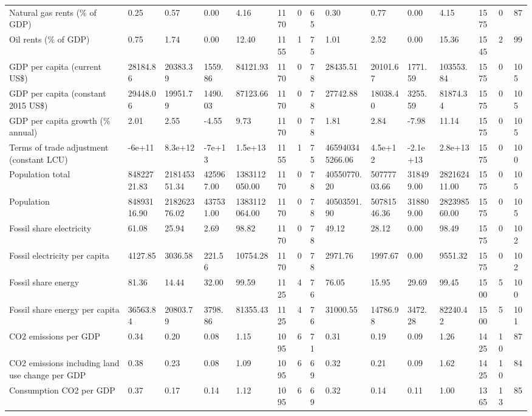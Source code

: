 \begin{longtable}{lllllllllllllll}
Natural gas rents (\% of GDP) & 0.25 & 0.57 & 0.00 & 4.16 & 1170 & 0 & 65 & 0.30 & 0.77 & 0.00 & 4.15 & 1575 & 0 & 87\\
Oil rents (\% of GDP) & 0.75 & 1.74 & 0.00 & 12.40 & 1155 & 1 & 75 & 1.01 & 2.52 & 0.00 & 15.36 & 1545 & 2 & 99\\
GDP per capita (current US\$) & 28184.86 & 20383.39 & 1559.86 & 84121.93 & 1170 & 0 & 78 & 28435.51 & 20101.67 & 1771.59 & 103553.84 & 1575 & 0 & 105\\
GDP per capita (constant 2015 US\$) & 29448.06 & 19951.79 & 1490.03 & 87123.66 & 1170 & 0 & 78 & 27742.88 & 18038.40 & 3255.59 & 81874.34 & 1575 & 0 & 105\\
\addlinespace
GDP per capita growth (\% annual) & 2.01 & 2.55 & -4.55 & 9.73 & 1170 & 0 & 78 & 1.81 & 2.84 & -7.98 & 11.14 & 1575 & 0 & 105\\
Terms of trade adjustment (constant LCU) & -6e+11 & 8.3e+12 & -7e+13 & 1.5e+13 & 1155 & 1 & 75 & 465940345266.06 & 4.5e+12 & -2.1e+13 & 2.8e+13 & 1575 & 0 & 100\\
Population total & 84822721.83 & 218145351.34 & 425967.00 & 1383112050.00 & 1170 & 0 & 78 & 40550770.20 & 50777703.66 & 318499.00 & 282162411.00 & 1575 & 0 & 105\\
Population & 84893116.90 & 218262376.02 & 437531.00 & 1383112064.00 & 1170 & 0 & 78 & 40503591.90 & 50781546.36 & 318809.00 & 282398560.00 & 1575 & 0 & 105\\
Fossil share electricity & 61.08 & 25.94 & 2.69 & 98.82 & 1170 & 0 & 78 & 49.12 & 28.12 & 0.00 & 98.49 & 1575 & 0 & 102\\
\addlinespace
Fossil electricity per capita & 4127.85 & 3036.58 & 221.56 & 10754.28 & 1170 & 0 & 78 & 2971.76 & 1997.67 & 0.00 & 9551.32 & 1575 & 0 & 102\\
Fossil share energy & 81.36 & 14.44 & 32.00 & 99.59 & 1125 & 4 & 76 & 76.05 & 15.95 & 29.69 & 99.45 & 1500 & 5 & 100\\
Fossil share energy per capita & 36563.84 & 20803.79 & 3798.86 & 81355.43 & 1125 & 4 & 76 & 31000.55 & 14786.98 & 3472.28 & 82240.42 & 1500 & 5 & 101\\
CO2 emissions per GDP & 0.34 & 0.20 & 0.08 & 1.15 & 1095 & 6 & 71 & 0.31 & 0.19 & 0.09 & 1.26 & 1425 & 10 & 87\\
CO2 emissions including land use change per GDP & 0.38 & 0.23 & 0.08 & 1.09 & 1095 & 6 & 69 & 0.32 & 0.21 & 0.09 & 1.62 & 1425 & 10 & 84\\
\addlinespace
Consumption CO2 per GDP & 0.37 & 0.17 & 0.14 & 1.12 & 1095 & 6 & 69 & 0.32 & 0.14 & 0.11 & 1.00 & 1365 & 13 & 85\\

\end{longtable}
